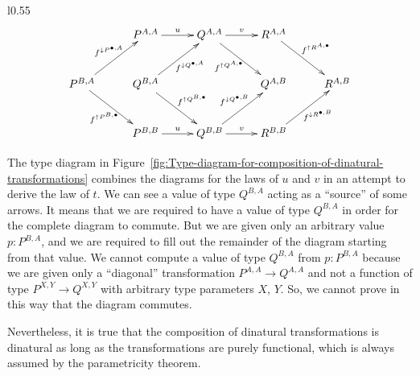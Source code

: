 \begin{wrapfigure}[12]{l}{0.55\columnwidth}%
\vspace{-1.6\baselineskip}
\[
\xymatrix{\xyScaleY{2.3pc}\xyScaleX{2.3pc} & P^{A,A}\ar[r]\sp(0.5){u} & Q^{A,A}\ar[r]\sp(0.5){v}\ar[rd]\sb(0.45){f^{\uparrow Q^{A,\bullet}}\negthickspace\negthickspace} & R^{A,A}\ar[rd]\sp(0.45){f^{\uparrow R^{A,\bullet}}}\\
P^{B,A}\ar[ru]\sp(0.5){f^{\downarrow P^{\bullet,A}}\negthickspace\negthickspace\negthickspace\negthickspace}\ar[rd]\sb(0.5){f^{\uparrow P^{B,\bullet}}\negthickspace\negthickspace} & Q^{B,A}\ar[ru]\sb(0.55){\negthickspace\negthickspace f^{\downarrow Q^{\bullet,A}}}\ar[rd]\sp(0.5){f^{\uparrow Q^{B,\bullet}}\negthickspace\negthickspace} &  & Q^{A,B} & R^{A,B}\\
 & P^{B,B}\ar[r]\sp(0.5){u} & Q^{B,B}\ar[r]\sp(0.5){v}\ar[ru]\sp(0.5){f^{\downarrow Q^{\bullet,B}}\negthickspace\negthickspace\negthickspace} & R^{B,B}\ar[ru]\sb(0.55){\negthickspace\negthickspace f^{\downarrow R^{\bullet,B}}}
}
\]

\vspace{-1.1\baselineskip}
\caption{Composition of dinatural transformations.\label{fig:Type-diagram-for-composition-of-dinatural-transformations}}

\vspace{-0\baselineskip}
\end{wrapfigure}%

\noindent The type diagram in Figure~\ref{fig:Type-diagram-for-composition-of-dinatural-transformations}
combines the diagrams for the laws of $u$ and $v$ in an attempt
to derive the law of $t$. We can see a value of type $Q^{B,A}$ acting
as a ``source'' of some arrows. It means that we are required to
have a value of type $Q^{B,A}$ in order for the complete diagram
to commute. But we are given only an arbitrary value $p:P^{B,A}$,
and we are required to fill out the remainder of the diagram starting
from that value. We cannot compute a value of type $Q^{B,A}$ from
$p:P^{B,A}$ because we are given only a ``diagonal'' transformation
$P^{A,A}\rightarrow Q^{A,A}$ and not a function of type $P^{X,Y}\rightarrow Q^{X,Y}$
with arbitrary type parameters $X$, $Y$. So, we cannot prove in
this way that the diagram commutes. 

Nevertheless, it is true that the composition of dinatural transformations
is dinatural \textemdash{} as long as the transformations are purely
functional, which is always assumed by the parametricity theorem.

